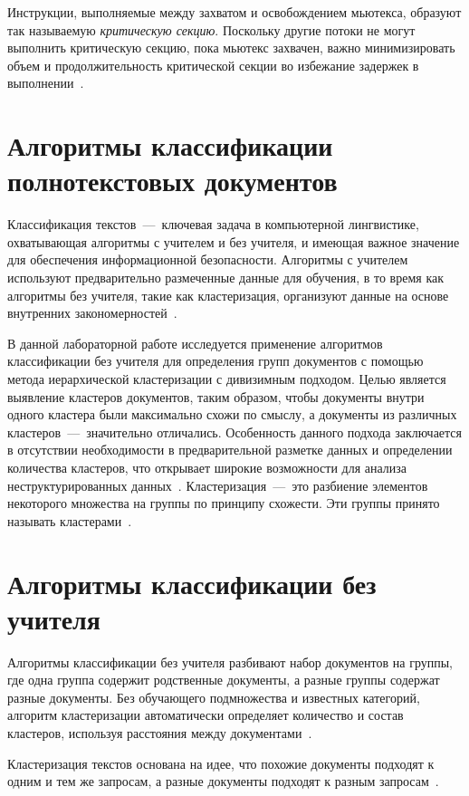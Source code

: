 Инструкции, выполняемые между захватом и освобождением мьютекса, образуют так называемую \textit{критическую секцию}.
Поскольку другие потоки не могут выполнить критическую секцию, пока мьютекс захвачен, важно минимизировать объем и продолжительность критической секции во избежание задержек в выполнении~\cite{process}.

\section{Алгоритмы классификации полнотекстовых документов}

Классификация текстов~---~ключевая задача в компьютерной лингвистике, охватывающая алгоритмы с учителем и без учителя, и имеющая важное значение для обеспечения информационной безопасности.
Алгоритмы с учителем используют предварительно размеченные данные для обучения, в то время как алгоритмы без учителя, такие как кластеризация, организуют данные на основе внутренних закономерностей~\cite{main-book}.

В данной лабораторной работе исследуется применение алгоритмов классификации без учителя для определения групп документов с помощью метода иерархической кластеризации с дивизимным подходом. 
Целью является выявление кластеров документов, таким образом, чтобы документы внутри одного кластера были максимально схожи по смыслу, а документы из различных кластеров~---~значительно отличались.
Особенность данного подхода заключается в отсутствии необходимости в предварительной разметке данных и определении количества кластеров, что открывает широкие возможности для анализа неструктурированных данных~\cite{main-book}.
Кластеризация~---~это разбиение элементов некоторого множества на группы по принципу схожести. Эти группы принято называть кластерами~\cite{defcluctering}.


\section{Алгоритмы классификации без учителя}

Алгоритмы классификации без учителя разбивают набор документов на группы, где одна группа содержит родственные документы, а разные группы содержат разные документы. 
Без обучающего подмножества и известных категорий, алгоритм кластеризации автоматически определяет количество и состав кластеров, используя расстояния между документами~\cite{main-book}.

Кластеризация текстов основана на идее, что похожие документы подходят к одним и тем же запросам, а разные документы подходят к разным запросам~\cite{main-book}.

